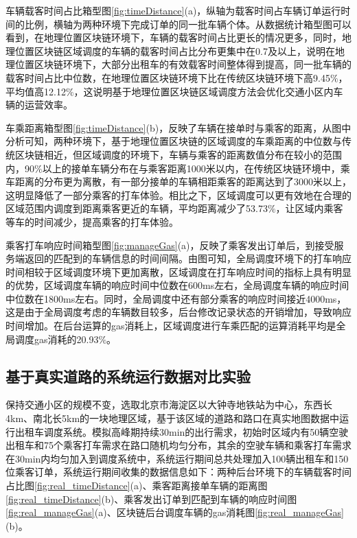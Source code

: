 车辆载客时间占比箱型图\ref{fig:timeDistance}(a)，纵轴为载客时间占车辆订单运行时间的比例，横轴为两种环境下完成订单的同一批车辆个体。从数据统计箱型图可以看到，在地理位置区块链环境下，车辆的载客时间占比更长的情况更多，同时，地理位置区块链区域调度的车辆的载客时间占比分布更集中在0.7及以上，说明在地理位置区块链环境下，大部分出租车的有效载客时间整体得到提高，同一批车辆的载客时间占比中位数，在地理位置区块链环境下比在传统区块链环境下高9.45$\%$，平均值高12.12$\%$，这说明基于地理位置区块链区域调度方法会优化交通小区内车辆的运营效率。

车乘距离箱型图\ref{fig:timeDistance}(b)，反映了车辆在接单时与乘客的距离，从图中分析可知，两种环境下，基于地理位置区块链的区域调度的车乘距离的中位数与传统区块链相近，但区域调度的环境下，车辆与乘客的距离数值分布在较小的范围内，90$\%$以上的接单车辆分布在与乘客距离1000米以内，在传统区块链环境中，乘车距离的分布更为离散，有一部分接单的车辆相距乘客的距离达到了3000米以上，这明显降低了一部分乘客的打车体验。相比之下，区域调度可以更有效地在合理的区域范围内调度到距离乘客更近的车辆，平均距离减少了53.73$\%$，让区域内乘客等车的时间减少，提高乘客的打车体验。

乘客打车响应时间箱型图\ref{fig:manageGas}(a)，反映了乘客发出订单后，到接受服务端返回的匹配到的车辆信息的时间间隔。由图可知，全局调度环境下的打车响应时间相较于区域调度环境下更加离散，区域调度在打车响应时间的指标上具有明显的优势，区域调度车辆的响应时间中位数在600ms左右，全局调度车辆的响应时间中位数在1800ms左右。同时，全局调度中还有部分乘客的响应时间接近4000ms，这是由于全局调度考虑的车辆数目较多，后台修改记录状态的开销增加，导致响应时间增加。在后台运算的gas消耗上，区域调度进行车乘匹配的运算消耗平均是全局调度gas消耗的20.93$\%$。

\subsection{基于真实道路的系统运行数据对比实验}
保持交通小区的规模不变，选取北京市海淀区以大钟寺地铁站为中心，东西长4km、南北长5km的一块地理区域，基于该区域的道路和路口在真实地图数据中运行出租车调度系统。模拟高峰期持续30min的出行需求，初始时区域内有50辆空驶出租车和75个乘客打车需求在路口随机均匀分布，其余的空驶车辆和乘客打车需求在30min内均匀加入到调度系统中，系统运行期间总共处理加入100辆出租车和150位乘客订单，系统运行期间收集的数据信息如下：两种后台环境下的车辆载客时间占比图\ref{fig:real_timeDistance}(a)、乘客距离接单车辆的距离图\ref{fig:real_timeDistance}(b)、乘客发出订单到匹配到车辆的响应时间图\ref{fig:real_manageGas}(a)、区块链后台调度车辆的gas消耗图\ref{fig:real_manageGas}(b)。


